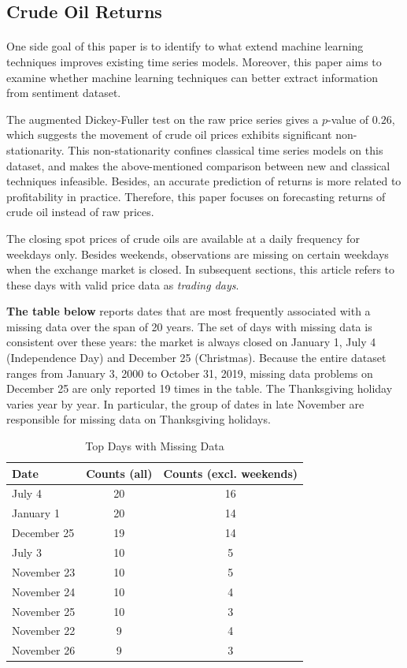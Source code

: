 \documentclass[12pt]{article}
\begin{document}
	\subsection{Crude Oil Returns}
	\paragraph{}One side goal of this paper is to identify to what extend machine learning techniques improves existing time series models. Moreover, this paper aims to examine whether machine learning techniques can better extract information from sentiment dataset.
	
	The augmented Dickey-Fuller test on the raw price series gives a $p$-value of $0.26$, which suggests the movement of crude oil prices exhibits significant non-stationarity.
	This non-stationarity confines classical time series models on this dataset, and makes the above-mentioned comparison between new and classical techniques infeasible.
	 Besides, an accurate prediction of returns is more related to profitability in practice. Therefore, this paper focuses on forecasting returns of crude oil instead of raw prices.
	
	\par The closing spot prices of crude oils are available at a daily frequency for weekdays only.
	Besides weekends, observations are missing on certain weekdays when the exchange market is closed.
	In subsequent sections, this article refers to these days with valid price data as \emph{trading days}.
	
	\par \textbf{The table below} reports dates that are most frequently associated with a missing data over the span of 20 years.
	The set of days with missing data is consistent over these years: the market is always closed on January 1, July 4 (Independence Day) and December 25 (Christmas).
	Because the entire dataset ranges from January 3, 2000 to October 31, 2019, missing data problems on December 25 are only reported 19 times in the table.
	The Thanksgiving holiday varies year by year. In particular, the group of dates in late November are responsible for missing data on Thanksgiving holidays. 
	\begin{table}[H]
		\small
		\centering
		\caption{Top Days with Missing Data}
		\begin{tabular}{l|c c}
			\toprule
Date & Counts (all) & Counts (excl. weekends) \\
			\midrule
July 4 & 20 & 16 \\
January 1 & 20 & 14 \\
December 25 & 19 & 14 \\
July 3 & 10 & 5 \\
November 23 & 10 & 5 \\
November 24 & 10 & 4\\
November 25 & 10 & 3\\
November 22 & 9 & 4 \\
November 26 & 9 & 3 \\
			\bottomrule
		\end{tabular}
	\end{table}
	
\end{document}
